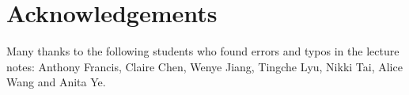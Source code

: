 \chapter*{Acknowledgements}%
\label{cha:acknowledgements}

Many thanks to the following students who found errors and typos in the lecture notes:
Anthony Francis, Claire Chen, Wenye Jiang, Tingche Lyu, Nikki Tai, Alice Wang and Anita Ye.

